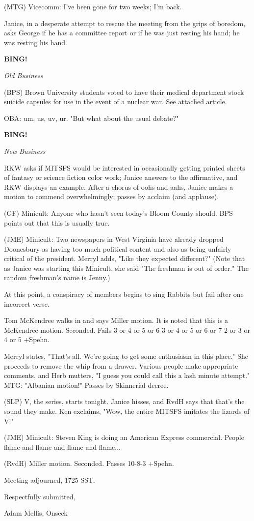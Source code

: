 \documentclass[12pt]{article}
\newcommand{\bing}{{\bf BING!} }
\newcommand{\goto}[1]{\bing \vskip 12pt \centerline{{\em{#1}}}}
\begin{document}
(MTG) Vicecomm: I've been gone for two weeks; I'm back.

Janice, in a desperate attempt to rescue the meeting from the grips of boredom, asks George if he has a committee report or if he was just resting his hand; he was resting his hand.

\goto{Old Business}

(BPS) Brown University students voted to have their medical department stock suicide capsules for use in the event of a nuclear war. See attached article.

OBA: um, us, uv, ur. "But what about the usual debate?"

\goto{New Business}

RKW asks if MITSFS would be interested in occasionally getting printed sheets of fantasy or science fiction color work; Janice answers to the affirmative, and RKW displays an example. After a chorus of oohs and aahs, Janice makes a motion to commend overwhelmingly; passes by acclaim (and applause).

(GF) Minicult: Anyone who hasn't seen today's Bloom County should. BPS points out that this is usually true.

(JME) Minicult: Two newspapers in West Virginia have already dropped Doonesbury as having too much political content and also as being unfairly critical of the president. Merryl adds, "Like they expected different?" (Note that as Janice was starting this Minicult, she said "The freshman is out of order." The random freshman's name is Jenny.)

At this point, a conspiracy of members begins to sing Rabbits but fail after one incorrect verse.

Tom McKendree walks in and says Miller motion. It is noted that this is a McKendree motion. Seconded. Fails 3 or 4 or 5 or 6-3 or 4 or 5 or 6 or 7-2 or 3 or 4 or 5 +Spehn.

Merryl states, "That's all. We're going to get some enthusiasm in this place." She proceeds to remove the whip from a drawer. Various people make appropriate comments, and Herb mutters, "I guess you could call this a lash minute attempt." MTG: "Albanian motion!" Passes by Skinnerial decree.

(SLP) V, the series, starts tonight. Janice hisses, and RvdH says that that's the sound they make. Ken exclaims, "Wow, the entire MITSFS imitates the lizards of V!"

(JME) Minicult: Steven King is doing an American Express commercial. People flame and flame and flame and flame...

(RvdH) Miller motion. Seconded. Passes 10-8-3 +Spehn.

\vspace{12pt}

\noindent
Meeting adjourned, 1725 SST.

\vspace{18pt}

\centerline{Respectfully submitted,}
\centerline{Adam Mellis, Onseck}
\end{document}
